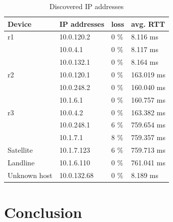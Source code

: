 \documentclass[parskip=full]{scrartcl}
\begin{document}
\begin{table}[hb]
	\centering
	\begin{tabular}{|llll|}
		\hline
		\textbf{Device} & \textbf{IP addresses} & \textbf{loss} &\textbf{avg. RTT}  \\ 
		\hline
		r1 	& 10.0.120.2 & 0 \% & 8.116 ms\\
		 	& 10.0.4.1 & 0 \% & 8.117 ms\\
		 	& 10.0.132.1 & 0 \% & 8.164 ms\\
		\hline
		r2	& 10.0.120.1 & 0 \% & 163.019 ms\\
			& 10.0.248.2 & 0 \% & 160.040 ms\\
			& 10.1.6.1 & 0 \% & 160.757 ms\\
		\hline
		r3	& 10.0.4.2 & 0 \% & 163.382 ms\\
			& 10.0.248.1 & 6 \% & 759.654 ms\\
			& 10.1.7.1 & 8 \% & 759.357 ms\\
		\hline
		Satellite & 10.1.7.123 & 6 \% & 759.713 ms \\
		\hline
		Landline & 10.1.6.110 & 0 \% & 761.041 ms \\
		\hline
		Unknown host & 10.0.132.68 & 0 \% & 8.189 ms\\
		\hline
	\end{tabular}
	\caption{Discovered IP addresses}
	\label{tab:data}
\end{table}


\newpage
\section{Conclusion}


\printbibliography
\end{document}
